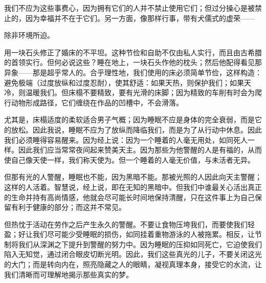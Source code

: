我们不应为这些事费心，因为拥有它们的人并不禁止使用它们；但过分操心是被禁止的，因为幸福并不在于它们。另一方面，像那样行事，带有犬儒式的虚荣——\par

\par

除非环境所迫。\par

用一块石头修正了婚床的不平坦。这种节俭和自助不仅由私人实行，而且由古希腊的首领实行。但何必说这些？睡在地上，一块石头作他的枕头；然后他配得看见那异象——那是超乎常人的。合乎理性地，我们使用的床必须简单节俭，这样构造：避免极端（过度放纵和过度忍耐），使其舒适：如果天热，则保护我们；如果天冷，则温暖我们。但床榻不要精致，要有光滑的床脚；因为精致的车削有时会为爬行动物形成路径，它们缠绕在作品的凹槽中，不会滑落。\par

尤其是，床榻适度的柔软适合男子气概；因为睡眠不应是身体的完全衰弱，而是它的放松。因此我说，睡眠不应为了放纵而降临我们，而是为了从行动中休息。因此我们必须睡得容易醒来。因为经上说：因为一个睡着的人毫无用处，如同死人一样。因此我们应当常常夜间起来赞美天主。因为那些为他警醒的人是有福的，从而使自己像天使一样，我们称天使为。但一个睡着的人毫无价值，与未活者无异。\par

但那有光的人警醒，睡眠也不能，因为黑暗不能。那被光照的人因此向天主警醒；这样的人活着。智慧说，经上说，即在无知的黑暗中。但我们中谁最关心活出真正的生命并持有高尚情感，他就会尽可能长时间地保持清醒，只在这件事上为自己保留有利于健康的部分；而这并不常见。\par

但热忱于活动在劳作之后产生永久的警醒。不要让食物压垮我们，而要使我们轻盈；好让我们尽可能少受睡眠的损伤，如同挂着重物游泳的人被拖累。相反，让节制将我们从深渊之下提升到警醒的努力中。因为睡眠的压抑如同死亡，它迫使我们陷入无知觉，通过闭合眼皮切断光明。因此，我们这些真光的儿子，不要关闭这光的大门；而是转向内在，照亮隐藏之人的眼睛，凝视真理本身，接受它的水流，让我们清晰而可理解地揭示那些真实的梦。\par

